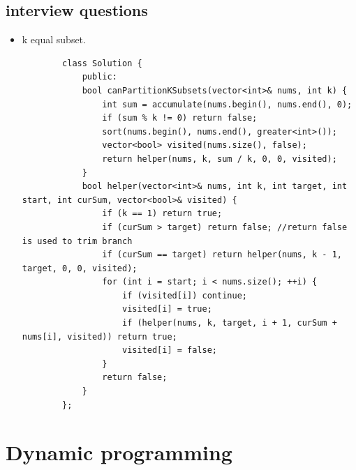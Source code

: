 \documentclass[a4paper,11pt,twoside]{book}
\begin{document}
\subsection{interview questions}
\begin{itemize}
	


\item k equal subset.
	
	\begin{lstlisting}
		class Solution {
			public:
			bool canPartitionKSubsets(vector<int>& nums, int k) {
				int sum = accumulate(nums.begin(), nums.end(), 0);
				if (sum % k != 0) return false;
				sort(nums.begin(), nums.end(), greater<int>());
				vector<bool> visited(nums.size(), false);
				return helper(nums, k, sum / k, 0, 0, visited);
			}
			bool helper(vector<int>& nums, int k, int target, int start, int curSum, vector<bool>& visited) {
				if (k == 1) return true;
				if (curSum > target) return false; //return false is used to trim branch
				if (curSum == target) return helper(nums, k - 1, target, 0, 0, visited);  
				for (int i = start; i < nums.size(); ++i) {
					if (visited[i]) continue;
					visited[i] = true;
					if (helper(nums, k, target, i + 1, curSum + nums[i], visited)) return true;
					visited[i] = false;
				}
				return false;
			}
		};
	\end{lstlisting}
	
	
\end{itemize}

\section{Dynamic programming}
\end{document}
